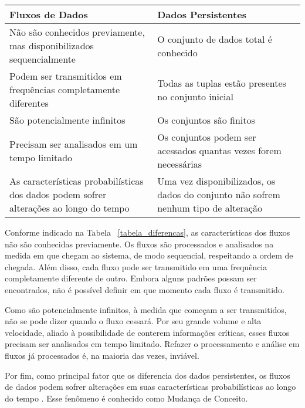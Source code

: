 \begin{table}[!htb]
\centering
\caption[Principais diferenças entre fluxos de dados e dados persistentes]{Principais diferenças entre fluxos de dados e dados persistentes. Adaptadas de }
\label{tabela_diferencas}
\begin{longtable}[c]{|p{7.5cm}|p{7.5cm}|}
\hline
\textbf{Fluxos de Dados} & \textbf{Dados Persistentes} \\ \hline
   Não são conhecidos previamente, mas disponibilizados sequencialmente  &             O conjunto de dados total é conhecido      \\ \hline
    Podem ser transmitidos em frequências completamente diferentes  &             Todas as tuplas estão presentes no conjunto inicial     \\ \hline
          São potencialmente infinitos  &             Os conjuntos são finitos     \\ \hline
                  Precisam ser analisados em um tempo limitado &            Os conjuntos podem ser acessados quantas vezes forem necessárias      \\ \hline
                  As características probabilísticas dos dados podem sofrer alterações ao longo do tempo &            Uma vez disponibilizados, os dados do conjunto não sofrem nenhum tipo de alteração      \\ \hline

\end{longtable}
\end{table}


Conforme indicado na Tabela ~\ref{tabela_diferencas},
as características dos fluxos não são conhecidas previamente. Os fluxos são
processados e analisados na medida em que chegam ao sistema, de modo sequencial, respeitando a ordem de chegada. Além disso, cada fluxo pode ser transmitido em uma frequência completamente diferente de outro. Embora alguns padrões possam ser encontrados, não é possível definir em que momento cada fluxo é transmitido. 

Como são potencialmente infinitos, à medida que começam a ser transmitidos, não se pode dizer quando o fluxo cessará. Por seu grande volume e alta velocidade, aliado à possibilidade de conterem informações críticas, esses fluxos precisam ser analisados em tempo limitado. Refazer o processamento e análise em fluxos já processados é, na maioria das vezes, inviável. 

Por fim, como principal fator que os diferencia dos dados persistentes, os fluxos de dados podem sofrer alterações em suas características probabilísticas ao longo do tempo
. Esse fenômeno é conhecido como Mudança de Conceito.

